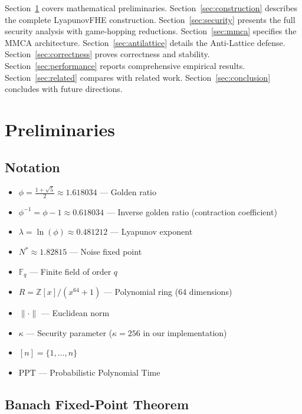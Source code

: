 \documentclass[11pt,a4paper]{article}
\begin{document}
Section~\ref{sec:prelim} covers mathematical preliminaries. Section~\ref{sec:construction} describes the complete LyapunovFHE construction. Section~\ref{sec:security} presents the full security analysis with game-hopping reductions. Section~\ref{sec:mmca} specifies the MMCA architecture. Section~\ref{sec:antilattice} details the Anti-Lattice defense. Section~\ref{sec:correctness} proves correctness and stability. Section~\ref{sec:performance} reports comprehensive empirical results. Section~\ref{sec:related} compares with related work. Section~\ref{sec:conclusion} concludes with future directions.

\newpage

\section{Preliminaries}
\label{sec:prelim}

\subsection{Notation}

\begin{itemize}[leftmargin=*,itemsep=1pt,topsep=2pt]
    \item $\phi = \frac{1+\sqrt{5}}{2} \approx 1.618034$ — Golden ratio
    \item $\phi^{-1} = \phi - 1 \approx 0.618034$ — Inverse golden ratio (contraction coefficient)
    \item $\lambda = \ln(\phi) \approx 0.481212$ — Lyapunov exponent
    \item $N^* \approx 1.82815$ — Noise fixed point
    \item $\mathbb{F}_q$ — Finite field of order $q$
    \item $R = \mathbb{Z}[x]/(x^{64}+1)$ — Polynomial ring (64 dimensions)
    \item $\| \cdot \|$ — Euclidean norm
    \item $\kappa$ — Security parameter ($\kappa = 256$ in our implementation)
    \item $[n] = \{1, \ldots, n\}$
    \item PPT — Probabilistic Polynomial Time
\end{itemize}

\subsection{Banach Fixed-Point Theorem}
\end{document}
